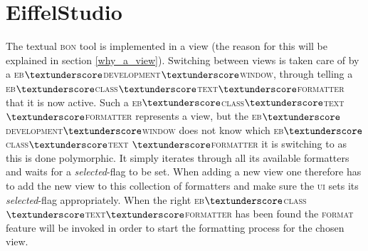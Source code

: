 \section{EiffelStudio}
\label{implementation_eiffelstudio}
The textual \textsc{bon} tool is implemented in a view (the reason for this will be explained in section \ref{why_a_view}). Switching between views is taken care of by a \textsc{eb$\textunderscore$development$\textunderscore$window}, through telling a \textsc{eb$\textunderscore$class$\textunderscore$text$\textunderscore$formatter} that it is now active. Such a \textsc{eb$\textunderscore$class$\textunderscore$text$\textunderscore$formatter} represents a view, but the \textsc{eb$\textunderscore$development$\textunderscore$window} does not know which \textsc{eb$\textunderscore$class$\textunderscore$text} \textsc{$\textunderscore$formatter} it is switching to as this is done polymorphic. It simply iterates through all its available formatters and waits for a \textit{selected}-flag to be set. When adding a new view one therefore has to add the new view to this collection of formatters and make sure the \textsc{ui} sets its \textit{selected}-flag appropriately. When the right \textsc{eb$\textunderscore$class$\textunderscore$text$\textunderscore$formatter} has been found the \textsc{format} feature will be invoked in order to start the formatting process for the chosen view.


